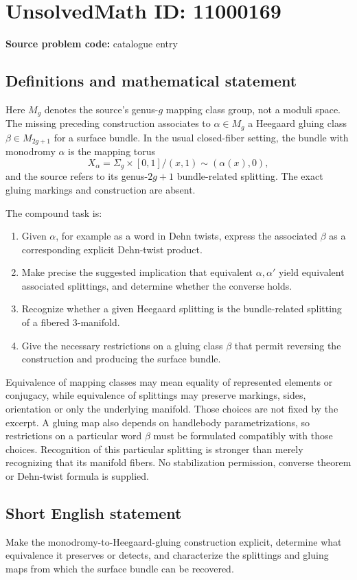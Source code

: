 \documentclass[11pt]{article}
\begin{document}
\section*{UnsolvedMath ID: 11000169}
\textbf{Source problem code:} catalogue entry
\subsection{Definitions and mathematical statement}
Here \(M_g\) denotes the source's genus-\(g\) mapping class group, not a moduli space. The missing preceding construction associates to \(\alpha\in M_g\) a Heegaard gluing class \(\beta\in M_{2g+1}\) for a surface bundle. In the usual closed-fiber setting, the bundle with monodromy \(\alpha\) is the mapping torus
\[
 X_\alpha=\Sigma_g\times[0,1]/(x,1)\sim(\alpha(x),0),
\]
and the source refers to its genus-\(2g+1\) bundle-related splitting. The exact gluing markings and construction are absent.

The compound task is:
\begin{enumerate}
\item Given \(\alpha\), for example as a word in Dehn twists, express the associated \(\beta\) as a corresponding explicit Dehn-twist product.
\item Make precise the suggested implication that equivalent \(\alpha,\alpha'\) yield equivalent associated splittings, and determine whether the converse holds.
\item Recognize whether a given Heegaard splitting is the bundle-related splitting of a fibered \(3\)-manifold.
\item Give the necessary restrictions on a gluing class \(\beta\) that permit reversing the construction and producing the surface bundle.
\end{enumerate}
Equivalence of mapping classes may mean equality of represented elements or conjugacy, while equivalence of splittings may preserve markings, sides, orientation or only the underlying manifold. Those choices are not fixed by the excerpt. A gluing map also depends on handlebody parametrizations, so restrictions on a particular word \(\beta\) must be formulated compatibly with those choices. Recognition of this particular splitting is stronger than merely recognizing that its manifold fibers. No stabilization permission, converse theorem or Dehn-twist formula is supplied.
\subsection{Short English statement}
Make the monodromy-to-Heegaard-gluing construction explicit, determine what equivalence it preserves or detects, and characterize the splittings and gluing maps from which the surface bundle can be recovered.
\end{document}
